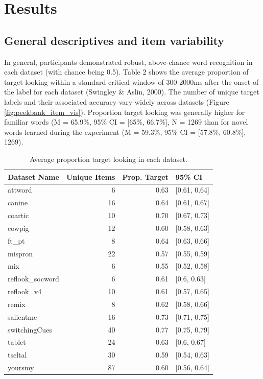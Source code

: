 \documentclass[10pt, letterpaper]{article}
\begin{document}
\hypertarget{results}{%
\section{Results}\label{results}}

\hypertarget{general-descriptives-and-item-variability}{%
\subsection{General descriptives and item
variability}\label{general-descriptives-and-item-variability}}

In general, participants demonstrated robust, above-chance word
recognition in each dataset (with chance being 0.5). Table 2 shows the
average proportion of target looking within a standard critical window
of 300-2000ms after the onset of the label for each dataset (Swingley \&
Aslin, 2000). The number of unique target labels and their associated
accuracy vary widely across datasets (Figure
\ref{fig:peekbank_item_vis}). Proportion target looking was generally
higher for familiar words (M = 65.9\%, 95\% CI = {[}65\%, 66.7\%{]}, N =
1269 than for novel words learned during the experiment (M = 59.3\%,
95\% CI = {[}57.8\%, 60.8\%{]}, 1269).

\begin{table}[H]
\centering
\begingroup\fontsize{9pt}{10pt}\selectfont
\begin{tabular}{lrrl}
  \hline
Dataset Name & Unique Items & Prop. Target & 95\% CI \\ 
  \hline
attword & 6 & 0.63 & [0.61, 0.64] \\ 
  canine & 16 & 0.64 & [0.61, 0.67] \\ 
  coartic & 10 & 0.70 & [0.67, 0.73] \\ 
  cowpig & 12 & 0.60 & [0.58, 0.63] \\ 
  ft\_pt & 8 & 0.64 & [0.63, 0.66] \\ 
  mispron & 22 & 0.57 & [0.55, 0.59] \\ 
  mix & 6 & 0.55 & [0.52, 0.58] \\ 
  reflook\_socword & 6 & 0.61 & [0.6, 0.63] \\ 
  reflook\_v4 & 10 & 0.61 & [0.57, 0.65] \\ 
  remix & 8 & 0.62 & [0.58, 0.66] \\ 
  salientme & 16 & 0.73 & [0.71, 0.75] \\ 
  switchingCues & 40 & 0.77 & [0.75, 0.79] \\ 
  tablet & 24 & 0.63 & [0.6, 0.67] \\ 
  tseltal & 30 & 0.59 & [0.54, 0.63] \\ 
  yoursmy & 87 & 0.60 & [0.56, 0.64] \\ 
   \hline
\end{tabular}
\endgroup
\caption{Average proportion target looking in each dataset.} 
\end{table}
\end{document}
